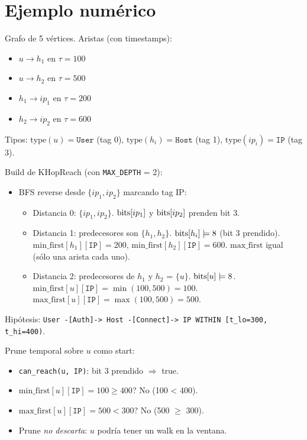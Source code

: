 \section{Ejemplo numérico}

\begin{ejemplo}
Grafo de 5 vértices. Aristas (con timestamps):
\begin{itemize}
    \item \(u \to h_1\) en \(\tau = 100\)
    \item \(u \to h_2\) en \(\tau = 500\)
    \item \(h_1 \to ip_1\) en \(\tau = 200\)
    \item \(h_2 \to ip_2\) en \(\tau = 600\)
\end{itemize}

\noindent
Tipos: \(\mathrm{type}(u) = \texttt{User}\) (tag 0),
\(\mathrm{type}(h_i) = \texttt{Host}\) (tag 1),
\(\mathrm{type}(ip_i) = \texttt{IP}\) (tag 3).

Build de KHopReach (con \texttt{MAX\_DEPTH} = 2):

\begin{itemize}
    \item BFS reverse desde \(\{ip_1, ip_2\}\) marcando tag IP:
    \begin{itemize}
        \item Distancia 0: \(\{ip_1, ip_2\}\). \(\mathrm{bits}[ip_1]\) y
        \(\mathrm{bits}[ip_2]\) prenden bit 3.
        \item Distancia 1: predecesores son \(\{h_1, h_2\}\).
        \(\mathrm{bits}[h_i] \mathrel{|}\!= 8\) (bit 3 prendido).
        \(\mathrm{min\_first}[h_1][\texttt{IP}] = 200\),
        \(\mathrm{min\_first}[h_2][\texttt{IP}] = 600\). \(\mathrm{max\_first}\)
        igual (sólo una arista cada uno).
        \item Distancia 2: predecesores de \(h_1\) y \(h_2\) =
        \(\{u\}\). \(\mathrm{bits}[u] \mathrel{|}\!= 8\).
        \(\mathrm{min\_first}[u][\texttt{IP}] = \min(100, 500) = 100\).
        \(\mathrm{max\_first}[u][\texttt{IP}] = \max(100, 500) = 500\).
    \end{itemize}
\end{itemize}

\noindent
Hipótesis: \texttt{User -[Auth]-> Host -[Connect]-> IP WITHIN [t\_lo=300, t\_hi=400)}.

Prune temporal sobre \(u\) como start:
\begin{itemize}
    \item \texttt{can\_reach(u, IP)}: bit 3 prendido $\Rightarrow$
    true.
    \item \(\mathrm{min\_first}[u][\texttt{IP}] = 100 \geq 400\)?
    No (100 < 400).
    \item \(\mathrm{max\_first}[u][\texttt{IP}] = 500 < 300\)? No
    (500 \(\geq\) 300).
    \item Prune \emph{no descarta}: \(u\) podría tener un walk en
    la ventana.
\end{itemize}


\end{ejemplo}
